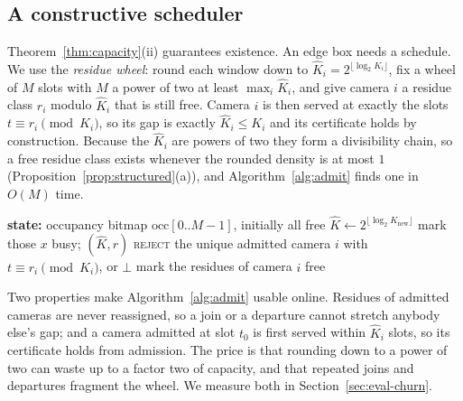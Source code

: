 \documentclass[preprint,review,12pt]{elsarticle}
\theoremstyle{definition}
\begin{document}
\subsection{A constructive scheduler}\label{sec:constructive}
Theorem~\ref{thm:capacity}(ii) guarantees existence. An edge box needs a schedule. We use the
\emph{residue wheel}: round each window down to $\hat K_i=2^{\lfloor\log_2 K_i\rfloor}$, fix a
wheel of $M$ slots with $M$ a power of two at least $\max_i\hat K_i$, and give camera $i$ a
residue class $r_i$ modulo $\hat K_i$ that is still free. Camera $i$ is then served at exactly the
slots $t\equiv r_i \pmod{\hat K_i}$, so its gap is exactly $\hat K_i\le K_i$ and its certificate
holds by construction. Because the $\hat K_i$ are powers of two they form a divisibility chain, so
a free residue class exists whenever the rounded density is at most $1$
(Proposition~\ref{prop:structured}(a)), and Algorithm~\ref{alg:admit} finds one in $O(M)$ time.

\begin{algorithm}[t]
\caption{Admission and service on one edge box}
\label{alg:admit}
\begin{algorithmic}[1]
\State \textbf{state:} occupancy bitmap $\mathrm{occ}[0..M-1]$, initially all free
  \State $\hat K \gets 2^{\lfloor\log_2 K_{\mathrm{new}}\rfloor}$
        \State mark those $x$ busy; \Return $(\hat K, r)$ 
     \EndIf
  \EndFor
  \State \Return \textsc{reject} 
\EndProcedure
{}
  \State \Return the unique admitted camera $i$ with $t \equiv r_i \pmod{\hat K_i}$, or $\bot$
\EndProcedure
{} \State mark the residues of camera $i$ free \EndProcedure
\end{algorithmic}
\end{algorithm}

Two properties make Algorithm~\ref{alg:admit} usable online. Residues of admitted cameras are
never reassigned, so a join or a departure cannot stretch anybody else's gap; and a camera
admitted at slot $t_0$ is first served within $\hat K_i$ slots, so its certificate holds from
admission. The price is that rounding down to a power of two can waste up to a factor two of
capacity, and that repeated joins and departures fragment the wheel. We measure both in
Section~\ref{sec:eval-churn}.
\end{document}
